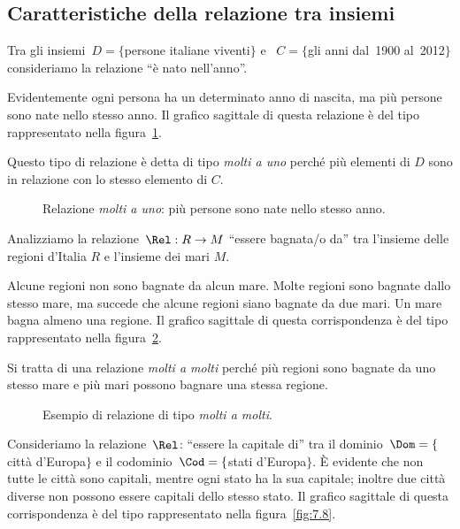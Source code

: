 \subsection{Caratteristiche della relazione tra insiemi}
\begin{exrig}
\begin{esempio}
Tra gli insiemi~$D= \{$persone italiane viventi$\}$ e ~$C= \{$gli anni dal~1900 al~2012$\}$ consideriamo la relazione ``è nato nell'anno''.

Evidentemente ogni persona ha un determinato anno di nascita, ma più persone sono nate nello stesso anno.
Il grafico sagittale di questa relazione è del tipo rappresentato nella figura~\ref{fig:7.6}.

Questo tipo di relazione è detta di tipo \emph{molti a uno} perché più elementi di $D$ sono in relazione con lo stesso elemento di $C$.
\end{esempio}
\begin{figure}[hb]
 \centering
 \caption{Relazione \emph{molti a uno}: più persone sono nate nello stesso anno.}\label{fig:7.6}
\end{figure}

\begin{esempio}
Analizziamo la relazione~$\Rel:R \rightarrow M$ ``essere bagnata/o da'' tra l'insieme delle regioni d'Italia $R$ e l'insieme dei mari $M$.

Alcune regioni non sono bagnate da alcun mare. Molte regioni sono bagnate dallo stesso mare, ma succede che alcune regioni siano bagnate da due mari.
Un mare bagna almeno una regione. Il grafico sagittale di questa corrispondenza è del tipo rappresentato nella
figura~\ref{fig:7.7}.

Si tratta di una relazione \emph{molti a molti} perché più regioni sono bagnate da uno stesso mare e più mari possono bagnare una stessa regione.
\begin{figure}[hb]
 \centering
 \caption{Esempio di relazione di tipo \emph{molti a molti}.}\label{fig:7.7}
\end{figure}
\end{esempio}

 \begin{esempio}
Consideriamo la relazione~$\Rel$: ``essere la capitale di'' tra il dominio~$\Dom= \{$città d'Europa$\}$ e il codominio~$\Cod= \{$stati d'Europa$\}$. È evidente che non tutte le città sono capitali, mentre ogni stato ha la sua capitale; inoltre due città diverse non possono essere capitali dello stesso stato.
Il grafico sagittale di questa corrispondenza è del tipo rappresentato nella
figura~\ref{fig:7.8}.


\end{esempio}
\end{exrig}
